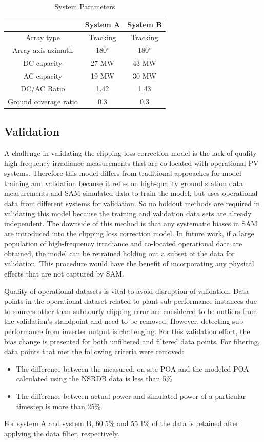 \documentclass[conference]{IEEEtran}
\begin{document}
\begin{table}[htbp]
\caption{System Parameters}
\begin{center}
\begin{tabular}{ |c|c|c| } 
\hline
& System A & System B \\
\hline
Array type & Tracking & Tracking \\
\hline
Array axis azimuth & 180$^{\circ}$ & 180$^{\circ}$\\
\hline
DC capacity & 27 MW & 43 MW\\
\hline
AC capacity & 19 MW & 30 MW \\
\hline
DC/AC Ratio & 1.42 & 1.43 \\
\hline
Ground coverage ratio & 0.3 & 0.3 \\
\hline
\end{tabular}
\end{center}
\label{table1}
\end{table}



\subsection{Validation}
A challenge in validating the clipping loss correction model is the lack of quality high-frequency irradiance measurements that are co-located with operational PV systems. Therefore this model differs from traditional approaches for model training and validation because it relies on high-quality ground station data measurements and SAM-simulated data to train the model, but uses operational data from different systems for validation. So no holdout methods are required in validating this model because the training and validation data sets are already independent. The downside of this method is that any systematic biases in SAM are introduced into the clipping loss correction model. In future work, if a large population of high-frequency irradiance and co-located operational data are obtained, the model can be retrained holding out a subset of the data for validation. This procedure would have the benefit of incorporating any physical effects that are not captured by SAM.

Quality of operational datasets is vital to avoid disruption of validation. Data points in the operational dataset related to plant sub-performance instances due to sources other than subhourly clipping error are considered to be outliers from the validation's standpoint and need to be removed. However, detecting sub-performance from inverter output is challenging. For this validation effort, the bias change is presented for both unfiltered and filtered data points. For filtering, data points that met the following criteria were removed: 
\begin{itemize}
\item The difference between the measured, on-site POA and the modeled POA calculated using the NSRDB \cite{Sengupta2018} data is less than 5\% 
\item The difference between actual power and simulated power of a particular timestep is more than 25\%. 
\end{itemize}
For system A and system B, 60.5\% and 55.1\% of the data is retained after applying the data filter, respectively.
\end{document}
